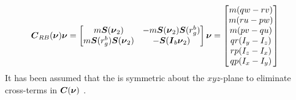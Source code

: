 \begin{equation}
\begin{split}
    \boldsymbol{C}_{RB}(\boldsymbol{\nu})\boldsymbol{\nu} &= 
    \begin{bmatrix}
        m\boldsymbol{S}(\boldsymbol{\nu}_{2})              & -m\boldsymbol{S}(\boldsymbol{\nu}_{2})\boldsymbol{S}(r_g^b)  \\
        m\boldsymbol{S}(r_g^b)\boldsymbol{S}(\boldsymbol{\nu}_{2}) & -\boldsymbol{S}(\boldsymbol{I}_{b}\boldsymbol{\nu}_{2}) \\
    \end{bmatrix}
    \boldsymbol{\nu} = 
    \begin{bmatrix}
    m (q w-r v) \\
    m (r u-p w) \\
    m (p v-q u) \\
    q r(I_{y}-I_{z}) \\
    r p(I_{z}-I_{x}) \\
    q p(I_{x}-I_{y}) \\
    \end{bmatrix}
\end{split}
\end{equation}
It has been assumed that the \abbrROV is symmetric about the $xyz$-plane to eliminate cross-terms in $\boldsymbol{C}(\boldsymbol{\nu})$ \citep[p. 55]{fossen2011}.

